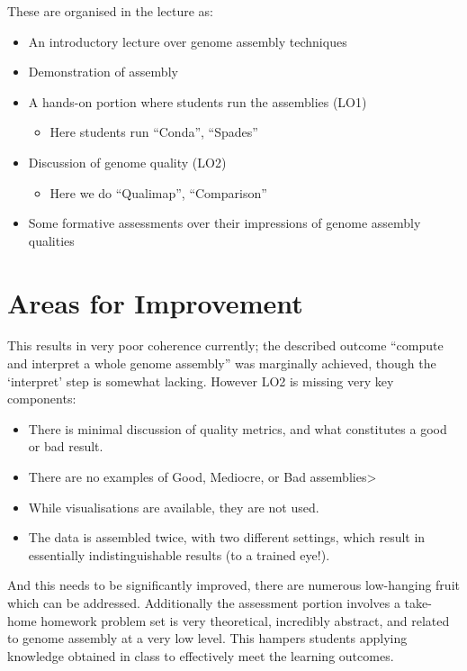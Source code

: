 \documentclass[paper=a4,justified,a4paper]{tufte-handout}
\providecommand{\tightlist}{%
  \setlength{\itemsep}{0pt}\setlength{\parskip}{0pt}}
\begin{document}
These are organised in the lecture as:

\begin{itemize}
\tightlist
\item
  An introductory lecture over genome assembly techniques
\item
  Demonstration of assembly
\item
  A hands-on portion where students run the assemblies (LO1)

  \begin{itemize}
  \tightlist
  \item
    Here students run ``Conda'', ``Spades''
  \end{itemize}
\item
  Discussion of genome quality (LO2)

  \begin{itemize}
  \tightlist
  \item
    Here we do ``Qualimap'', ``Comparison''
  \end{itemize}
\item
  Some formative assessments over their impressions of genome assembly
  qualities
\end{itemize}

\hypertarget{areas-for-improvement}{%
\section{Areas for Improvement}\label{areas-for-improvement}}

This results in very poor coherence currently; the described outcome
``compute and interpret a whole genome assembly'' was marginally
achieved, though the `interpret' step is somewhat lacking. However LO2
is missing very key components:

\begin{itemize}
\tightlist
\item
  There is minimal discussion of quality metrics, and what constitutes a
  good or bad result.
\item
  There are no examples of Good, Mediocre, or Bad
  assemblies\textgreater{}
\item
  While visualisations are available, they are not used.
\item
  The data is assembled twice, with two different settings, which result
  in essentially indistinguishable results (to a trained eye!).
\end{itemize}

And this needs to be significantly improved, there are numerous
low-hanging fruit which can be addressed. Additionally the assessment
portion involves a take-home homework problem set is very theoretical,
incredibly abstract, and related to genome assembly at a very low level.
This hampers students applying knowledge obtained in class to
effectively meet the learning outcomes.
\end{document}
